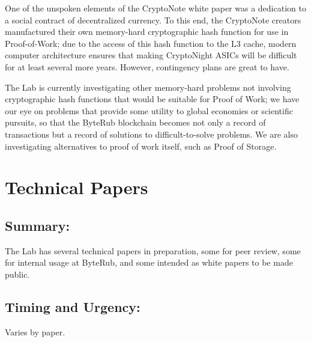 \documentclass[12pt,english]{mrl}
\theoremstyle{definition}
\numberwithin{equation}{section}
\numberwithin{figure}{section}
\numberwithin{equation}{section}
\numberwithin{equation}{section}
\numberwithin{figure}{section}
\begin{document}
One of the unspoken elements of the CryptoNote white paper was a dedication to a social contract of decentralized currency. To this end, the CryptoNote creators manufactured their own memory-hard cryptographic hash function for use in Proof-of-Work; due to the access of this hash function to the L3 cache, modern computer architecture ensures that making CryptoNight ASICs will be difficult for at least several more years. However, contingency plans are great to have.

The Lab is currently investigating other memory-hard problems not involving cryptographic hash functions that would be suitable for Proof of Work; we have our eye on problems that provide some utility to global economies or scientific pursuits, so that the ByteRub blockchain becomes not only a record of transactions but a record of solutions to difficult-to-solve problems. We are also investigating alternatives to proof of work itself, such as Proof of Storage.




\section{Technical Papers}

\subsection{Summary:}

The Lab has several technical papers in preparation, some for peer review, some for internal usage at ByteRub, and some intended as white papers to be made public.

\subsection{Timing and Urgency:}

Varies by paper.
\end{document}
